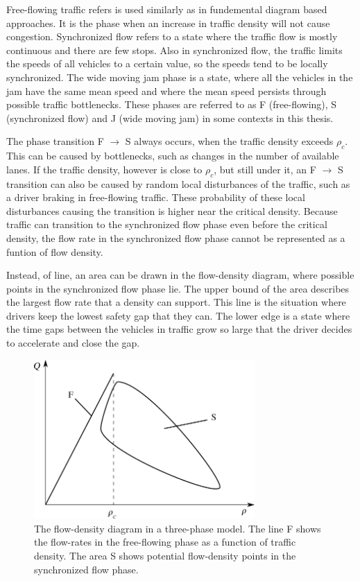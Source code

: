 \documentclass[english, 12pt, a4paper, elec, utf8, pdfa, online]{aaltothesis}
\begin{document}
Free-flowing traffic refers is used similarly as in fundemental diagram based approaches. It is the phase when an increase in traffic density will not cause congestion. Synchronized flow refers to a state where the traffic flow is mostly continuous and there are few stops. Also in synchronized flow, the traffic limits the speeds of all vehicles to a certain value, so the speeds tend to be locally synchronized. The wide moving jam phase is a state, where all the vehicles in the jam have the same mean speed and where the mean speed persists through possible traffic bottlenecks. These phases are referred to as F (free-flowing), S (synchronized flow) and J (wide moving jam) in some contexts in this thesis.

The phase transition F $\to$ S always occurs, when the traffic density exceeds $\rho_c$. This can be caused by bottlenecks, such as changes in the number of available lanes. If the traffic density, however is close to $\rho_c$, but still under it, an F $\to$ S transition can also be caused by random local disturbances of the traffic, such as a driver braking in free-flowing traffic. These probability of these local disturbances causing the transition is higher near the critical density. Because traffic can transition to the synchronized flow phase even before the critical density, the flow rate in the synchronized flow phase cannot be represented as a funtion of flow density.

Instead, of line, an area can be drawn in the flow-density diagram, where possible points in the synchronized flow phase lie. The upper bound of the area describes the largest flow rate that a density can support. This line is the situation where drivers keep the lowest safety gap that they can. The lower edge is a state where the time gaps between the vehicles in traffic grow so large that the driver decides to accelerate and close the gap. \cite{kerner}

\begin{figure}[h]
    \centering
    \includegraphics[width=0.75\textwidth]{graphs/3phase_fs_diagram}
    \caption{The flow-density diagram in a three-phase model. The line F shows the flow-rates in the free-flowing phase as a function of traffic density. The area S shows potential flow-density points in the synchronized flow phase. }
\end{figure}
\end{document}
